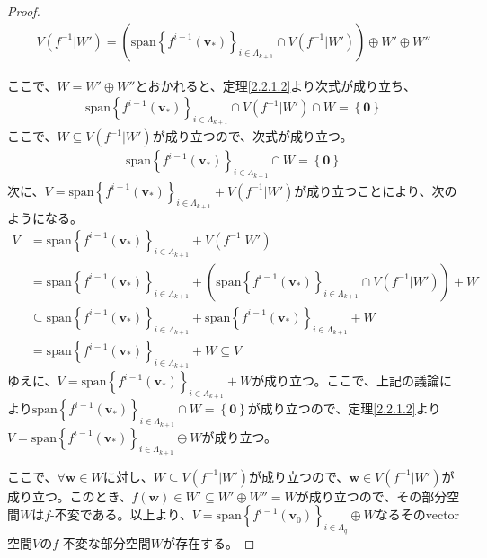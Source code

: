 \documentclass[dvipdfmx]{jsarticle}
\begin{document}
\begin{proof}
\begin{align*}
V\left( f^{- 1}|W' \right) = \left( {\mathrm{span}}\left\{ f^{i - 1}\left( \mathbf{v}_{*} \right) \right\}_{i \in \varLambda_{k + 1}} \cap V\left( f^{- 1}|W' \right) \right) \oplus W' \oplus W''
\end{align*}\par
ここで、$W = W' \oplus W''$とおかれると、定理\ref{2.2.1.2}より次式が成り立ち、
\begin{align*}
{\mathrm{span}}\left\{ f^{i - 1}\left( \mathbf{v}_{*} \right) \right\}_{i \in \varLambda_{k + 1}} \cap V\left( f^{- 1}|W' \right) \cap W = \left\{ \mathbf{0} \right\}
\end{align*}
ここで、$W \subseteq V\left( f^{- 1}|W' \right)$が成り立つので、次式が成り立つ。
\begin{align*}
{\mathrm{span}}\left\{ f^{i - 1}\left( \mathbf{v}_{*} \right) \right\}_{i \in \varLambda_{k + 1}} \cap W = \left\{ \mathbf{0} \right\}
\end{align*}
次に、$V = {\mathrm{span}}\left\{ f^{i - 1}\left( \mathbf{v}_{*} \right) \right\}_{i \in \varLambda_{k + 1}} + V\left( f^{- 1}|W' \right)$が成り立つことにより、次のようになる。
\begin{align*}
V &= {\mathrm{span}}\left\{ f^{i - 1}\left( \mathbf{v}_{*} \right) \right\}_{i \in \varLambda_{k + 1}} + V\left( f^{- 1}|W' \right)\\
&= {\mathrm{span}}\left\{ f^{i - 1}\left( \mathbf{v}_{*} \right) \right\}_{i \in \varLambda_{k + 1}} + \left( {\mathrm{span}}\left\{ f^{i - 1}\left( \mathbf{v}_{*} \right) \right\}_{i \in \varLambda_{k + 1}} \cap V\left( f^{- 1}|W' \right) \right) + W\\
&\subseteq {\mathrm{span}}\left\{ f^{i - 1}\left( \mathbf{v}_{*} \right) \right\}_{i \in \varLambda_{k + 1}} + {\mathrm{span}}\left\{ f^{i - 1}\left( \mathbf{v}_{*} \right) \right\}_{i \in \varLambda_{k + 1}} + W\\
&= {\mathrm{span}}\left\{ f^{i - 1}\left( \mathbf{v}_{*} \right) \right\}_{i \in \varLambda_{k + 1}} + W \subseteq V
\end{align*}
ゆえに、$V = {\mathrm{span}}\left\{ f^{i - 1}\left( \mathbf{v}_{*} \right) \right\}_{i \in \varLambda_{k + 1}} + W$が成り立つ。ここで、上記の議論により${\mathrm{span}}\left\{ f^{i - 1}\left( \mathbf{v}_{*} \right) \right\}_{i \in \varLambda_{k + 1}} \cap W = \left\{ \mathbf{0} \right\}$が成り立つので、定理\ref{2.2.1.2}より$V = {\mathrm{span}}\left\{ f^{i - 1}\left( \mathbf{v}_{*} \right) \right\}_{i \in \varLambda_{k + 1}} \oplus W$が成り立つ。\par
ここで、$\forall\mathbf{w} \in W$に対し、$W \subseteq V\left( f^{- 1}|W' \right)$が成り立つので、$\mathbf{w} \in V\left( f^{- 1}|W' \right)$が成り立つ。このとき、$f\left( \mathbf{w} \right) \in W' \subseteq W' \oplus W'' = W$が成り立つので、その部分空間$W$は$f$-不変である。以上より、$V = {\mathrm{span}}\left\{ f^{i - 1}\left( \mathbf{v}_{0} \right) \right\}_{i \in \varLambda_{q}} \oplus W$なるそのvector空間$V$の$f$-不変な部分空間$W$が存在する。
\end{proof}
\end{document}

